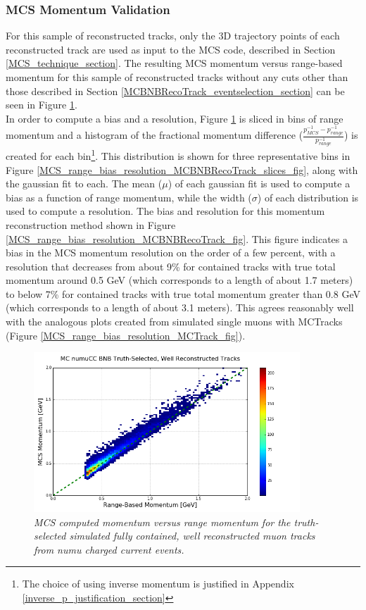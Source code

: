 \subsubsection{MCS Momentum Validation}\label{MCS_Momentum_Validation_MCBNBRecoTrack_section}
For this sample of reconstructed tracks, only the 3D trajectory points of each reconstructed track are used as input to the MCS code, described in Section \ref{MCS_technique_section}. The resulting MCS momentum versus range-based momentum for this sample of reconstructed tracks without any cuts other than those described in Section \ref{MCBNBRecoTrack_eventselection_section} can be seen in Figure \ref{MCS_range_momentum_MCBNBRecoTrack_fig}. \\

In order to compute a bias and a resolution, Figure \ref{MCS_range_momentum_MCBNBRecoTrack_fig} is sliced in bins of range momentum and a histogram of the fractional momentum difference ($\frac{p_{MCS}^{-1} - p_{range}^{-1}}{p_{range}^{-1}}$) is created for each bin\footnote{The choice of using inverse momentum is justified in Appendix \ref{inverse_p_justification_section}}. This distribution is shown for three representative bins in Figure \ref{MCS_range_bias_resolution_MCBNBRecoTrack_slices_fig}, along with the gaussian fit to each.  The mean ($\mu$) of each gaussian fit is used to compute a bias as a function of range momentum, while the width ($\sigma$) of each distribution is used to compute a resolution. The bias and resolution for this momentum reconstruction method shown in Figure \ref{MCS_range_bias_resolution_MCBNBRecoTrack_fig}. This figure indicates a bias in the MCS momentum resolution on the order of a few percent, with a resolution that decreases from about 9\% for contained tracks with true total momentum around 0.5 GeV (which corresponds to a length of about 1.7 meters) to below 7\% for contained tracks with true total momentum greater than 0.8 GeV (which corresponds to a length of about 3.1 meters). This agrees reasonably well with the analogous plots created from simulated single muons with {\sc MCTracks} (Figure \ref{MCS_range_bias_resolution_MCTrack_fig}).


\begin{figure}[ht!]
\begin{center}
\includegraphics[width=100mm]{Figures/MCS_range_comparison_MCBNBRecoTrack.png}
\end{center}
\caption{\textit{MCS computed momentum versus range momentum for the truth-selected simulated fully contained, well reconstructed muon tracks from numu charged current events.}}
\label{MCS_range_momentum_MCBNBRecoTrack_fig}
\end{figure}


